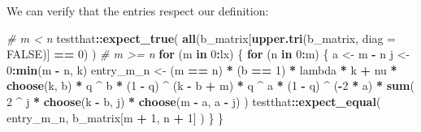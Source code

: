 \documentclass[]{article}
\newenvironment{Shaded}{\begin{snugshade}}{\end{snugshade}}
\newcommand{\CommentTok}[1]{\textcolor[rgb]{0.56,0.35,0.01}{\textit{#1}}}
\newcommand{\ControlFlowTok}[1]{\textcolor[rgb]{0.13,0.29,0.53}{\textbf{#1}}}
\newcommand{\DataTypeTok}[1]{\textcolor[rgb]{0.13,0.29,0.53}{#1}}
\newcommand{\DecValTok}[1]{\textcolor[rgb]{0.00,0.00,0.81}{#1}}
\newcommand{\KeywordTok}[1]{\textcolor[rgb]{0.13,0.29,0.53}{\textbf{#1}}}
\newcommand{\NormalTok}[1]{#1}
\newcommand{\OperatorTok}[1]{\textcolor[rgb]{0.81,0.36,0.00}{\textbf{#1}}}
\newcommand{\OtherTok}[1]{\textcolor[rgb]{0.56,0.35,0.01}{#1}}
\newcommand{\StringTok}[1]{\textcolor[rgb]{0.31,0.60,0.02}{#1}}
\begin{document}
We can verify that the entries respect our definition:

\begin{Shaded}
\begin{Highlighting}[]
\CommentTok{# m < n}
\NormalTok{testthat}\OperatorTok{::}\KeywordTok{expect_true}\NormalTok{(}
  \KeywordTok{all}\NormalTok{(b_matrix[}\KeywordTok{upper.tri}\NormalTok{(b_matrix, }\DataTypeTok{diag =} \OtherTok{FALSE}\NormalTok{)] }\OperatorTok{==}\StringTok{ }\DecValTok{0}\NormalTok{)}
\NormalTok{)}
\CommentTok{# m >= n}
\ControlFlowTok{for}\NormalTok{ (m }\ControlFlowTok{in} \DecValTok{0}\OperatorTok{:}\NormalTok{lx) \{}
  \ControlFlowTok{for}\NormalTok{ (n }\ControlFlowTok{in} \DecValTok{0}\OperatorTok{:}\NormalTok{m) \{}
\NormalTok{    a <-}\StringTok{ }\NormalTok{m }\OperatorTok{-}\StringTok{ }\NormalTok{n}
\NormalTok{    j <-}\StringTok{ }\DecValTok{0}\OperatorTok{:}\KeywordTok{min}\NormalTok{(m }\OperatorTok{-}\StringTok{ }\NormalTok{n, k)}
\NormalTok{    entry_m_n <-}\StringTok{ }
\StringTok{      }\NormalTok{(m }\OperatorTok{==}\StringTok{ }\NormalTok{n) }\OperatorTok{*}\StringTok{ }\NormalTok{(b }\OperatorTok{==}\StringTok{ }\DecValTok{1}\NormalTok{) }\OperatorTok{*}\StringTok{ }\NormalTok{lambda }\OperatorTok{*}\StringTok{ }\NormalTok{k }\OperatorTok{+}
\StringTok{      }\NormalTok{nu }\OperatorTok{*}
\StringTok{      }\KeywordTok{choose}\NormalTok{(k, b) }\OperatorTok{*}\StringTok{ }\NormalTok{q }\OperatorTok{^}\StringTok{ }\NormalTok{b }\OperatorTok{*}
\StringTok{      }\NormalTok{(}\DecValTok{1} \OperatorTok{-}\StringTok{ }\NormalTok{q) }\OperatorTok{^}\StringTok{ }\NormalTok{(k }\OperatorTok{-}\StringTok{ }\NormalTok{b }\OperatorTok{+}\StringTok{ }\NormalTok{m) }\OperatorTok{*}
\StringTok{      }\NormalTok{q }\OperatorTok{^}\StringTok{ }\NormalTok{a }\OperatorTok{*}\StringTok{ }
\StringTok{      }\NormalTok{(}\DecValTok{1} \OperatorTok{-}\StringTok{ }\NormalTok{q) }\OperatorTok{^}\StringTok{ }\NormalTok{(}\OperatorTok{-}\DecValTok{2} \OperatorTok{*}\StringTok{ }\NormalTok{a) }\OperatorTok{*}
\StringTok{      }\KeywordTok{sum}\NormalTok{(}
        \DecValTok{2} \OperatorTok{^}\StringTok{ }\NormalTok{j }\OperatorTok{*}\StringTok{ }\KeywordTok{choose}\NormalTok{(k }\OperatorTok{-}\StringTok{ }\NormalTok{b, j) }\OperatorTok{*}\StringTok{ }\KeywordTok{choose}\NormalTok{(m }\OperatorTok{-}\StringTok{ }\NormalTok{a, a }\OperatorTok{-}\StringTok{ }\NormalTok{j)}
\NormalTok{      )}
\NormalTok{    testthat}\OperatorTok{::}\KeywordTok{expect_equal}\NormalTok{(}
\NormalTok{      entry_m_n,}
\NormalTok{      b_matrix[m }\OperatorTok{+}\StringTok{ }\DecValTok{1}\NormalTok{, n }\OperatorTok{+}\StringTok{ }\DecValTok{1}\NormalTok{]}
\NormalTok{    )}
\NormalTok{  \}}
\NormalTok{\}}
\end{Highlighting}
\end{Shaded}
\end{document}
